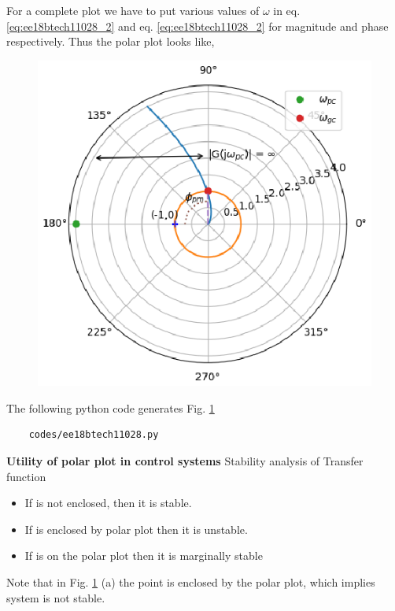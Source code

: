 \begin{enumerate}[label=\thesection.\arabic*.,ref=\thesection.\theenumi]
For a complete plot we have to put various values of $\omega$ in 
eq. \ref{eq:ee18btech11028_2} and eq. \ref{eq:ee18btech11028_2} for magnitude and phase respectively.
Thus the polar plot looks like, 
\begin{figure}[!h]
    \includegraphics[width=\columnwidth]{./figs/ee18btech11028/ee18btech11028.eps}
  \caption{}
  \label{fig:ee18btech11028_fig1}
\end{figure}

The following python code generates  Fig. \ref{fig:ee18btech11028_fig1}
\begin{lstlisting}
    codes/ee18btech11028.py
\end{lstlisting}
\textbf{Utility of polar plot in control systems}
Stability analysis of Transfer function
\begin{itemize}
    
    \item If   is not enclosed, then it is stable.
    \item If  is enclosed by polar plot then it is unstable. 
    \item If  is on the polar plot then it is marginally stable
    
    
\end{itemize}
Note that in Fig. \ref{fig:ee18btech11028_fig1} (a) the point  is enclosed by the polar plot,
which implies system is not stable.



\end{enumerate}
